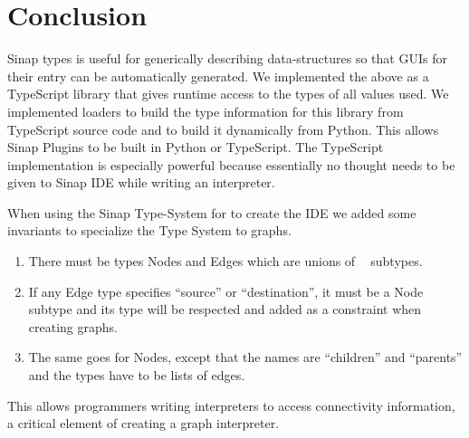 \documentclass{article}
\DeclareMathOperator{\ObjT}{ObjT_\Gamma}
\begin{document}
\section{Conclusion}

Sinap types is useful for generically describing data-structures 
so that GUIs for their entry can be automatically generated. We implemented the 
above as a TypeScript library that gives runtime access to the types 
of all values used. We implemented loaders to build the type information 
for this library from TypeScript source code and to build it dynamically from 
Python. This allows Sinap Plugins to be built in Python or TypeScript. 
The TypeScript implementation is especially powerful because essentially 
no thought needs to be given to Sinap IDE while writing an interpreter. 

When using the Sinap Type-System for to create the IDE we added 
some invariants to specialize the Type System to graphs. 
\begin{enumerate}
    \item There must be types Nodes and Edges which are unions of \(\ObjT\) subtypes. 
    \item If any Edge type specifies ``source'' or ``destination'', it must be a Node subtype
    and its type will be respected and added as a constraint when creating graphs.
    \item The same goes for Nodes, except that the names are ``children'' and 
    ``parents'' and the types have to be lists of edges.
\end{enumerate}

This allows programmers writing interpreters to access connectivity information, 
a critical element of creating a graph interpreter. 
\end{document}
